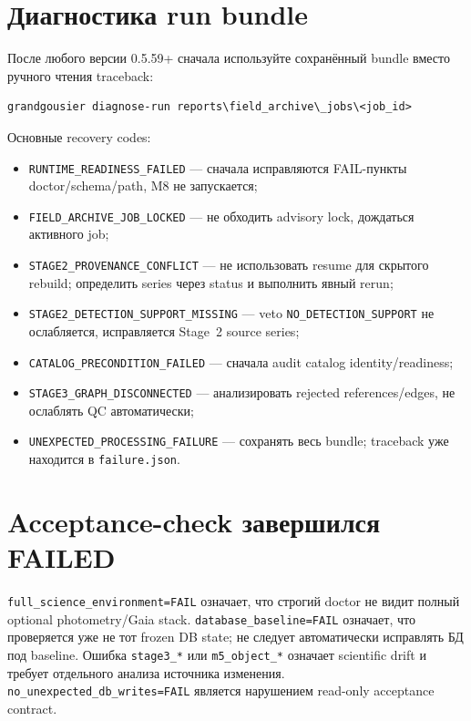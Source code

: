 \section{Диагностика run bundle}

После любого  версии 0.5.59+ сначала используйте сохранённый bundle вместо ручного чтения traceback:

\begin{lstlisting}
grandgousier diagnose-run reports\field_archive\_jobs\<job_id>
\end{lstlisting}

Основные recovery codes:
\begin{itemize}
  \item \texttt{RUNTIME\_READINESS\_FAILED} --- сначала исправляются FAIL-пункты doctor/schema/path, M8 не запускается;
  \item \texttt{FIELD\_ARCHIVE\_JOB\_LOCKED} --- не обходить advisory lock, дождаться активного job;
  \item \texttt{STAGE2\_PROVENANCE\_CONFLICT} --- не использовать resume для скрытого rebuild; определить series через status и выполнить явный rerun;
  \item \texttt{STAGE2\_DETECTION\_SUPPORT\_MISSING} --- veto \texttt{NO\_DETECTION\_SUPPORT} не ослабляется, исправляется Stage~2 source series;
  \item \texttt{CATALOG\_PRECONDITION\_FAILED} --- сначала audit catalog identity/readiness;
  \item \texttt{STAGE3\_GRAPH\_DISCONNECTED} --- анализировать rejected references/edges, не ослаблять QC автоматически;
  \item \texttt{UNEXPECTED\_PROCESSING\_FAILURE} --- сохранять весь bundle; traceback уже находится в \texttt{failure.json}.
\end{itemize}

\section{Acceptance-check завершился FAILED}

\texttt{full\_science\_environment=FAIL} означает, что строгий doctor не видит полный optional photometry/Gaia stack. \texttt{database\_baseline=FAIL} означает, что проверяется уже не тот frozen DB state; не следует автоматически исправлять БД под baseline. Ошибка \texttt{stage3\_*} или \texttt{m5\_object\_*} означает scientific drift и требует отдельного анализа источника изменения. \texttt{no\_unexpected\_db\_writes=FAIL} является нарушением read-only acceptance contract.

